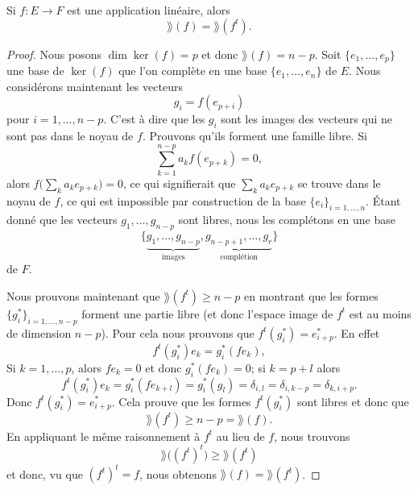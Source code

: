 \begin{lemma}   \label{LemSEpTcW}
    Si \( f\colon E\to F\) est une application linéaire, alors
    \begin{equation}
        \rang(f)=\rang(f^t).
    \end{equation}
\end{lemma}

\begin{proof}
    Nous posons \( \dim\ker(f)=p\) et donc \( \rang(f)=n-p\). Soit \( \{ e_1,\ldots, e_p \}\) une base de \( \ker(f)\) que l'on complète en une base \( \{ e_1,\ldots, e_n \}\) de \( E\). Nous considérons maintenant les vecteurs
    \begin{equation}
        g_i=f(e_{p+i})
    \end{equation}
    pour \( i=1,\ldots, n-p\). C'est à dire que les \( g_i\) sont les images des vecteurs qui ne sont pas dans le noyau de \( f\). Prouvons qu'ils forment une famille libre. Si
    \begin{equation}
        \sum_{k=1}^{n-p}a_kf(e_{p+k})=0,
    \end{equation}
    alors \( f\big( \sum_ka_ke_{p+k} \big)=0\), ce qui signifierait que \( \sum_ka_ke_{p+k}\) se trouve dans le noyau de \( f\), ce qui est impossible par construction de la base \( \{ e_i \}_{i=1,\ldots, n}\). Étant donné que les vecteurs \( g_1,\ldots, g_{n-p}\) sont libres, nous les complétons en une base
    \begin{equation}
        \{ \underbrace{g_1,\ldots, g_{n-p}}_{\text{images}},\underbrace{g_{n-p+1},\ldots, g_r}_{\text{complétion}} \}
    \end{equation}
    de \( F\).

    Nous prouvons maintenant que \( \rang(f^t)\geq n-p\) en montrant que les formes \( \{ g_i^* \}_{i=1,\ldots, n-p}\) forment une partie libre (et donc l'espace image de \( f^t\) est au moins de dimension \( n-p\)). Pour cela nous prouvons que \( f^t(g_i^*)=e^*_{i+p}\). En effet
    \begin{equation}
        f^t(g^*_i)e_k=g_i^*(fe_k),
    \end{equation}
    Si \( k=1,\ldots, p\), alors \( fe_k=0\) et donc \( g_i^*(fe_k)=0\); si \( k=p+l\) alors
    \begin{equation}
        f^t(g_i^*)e_k=g_i^*(fe_{k+l})=g^*_i(g_l)=\delta_{i,l}=\delta_{i,k-p}=\delta_{k,i+p}.
    \end{equation}
    Donc \( f^t(g_i^*)=e^*_{i+p}\). Cela prouve que les formes \( f^t(g_i^*)\) sont libres et donc que
    \begin{equation}
        \rang(f^t)\geq n-p=\rang(f).
    \end{equation}
    En appliquant le même raisonnement à \( f^t\) au lieu de \( f\), nous trouvons
    \begin{equation}
        \rang\big( (f^t)^t \big)\geq \rang(f^t)
    \end{equation}
    et donc, vu que \( (f^t)^t=f\), nous obtenons \( \rang(f)=\rang(f^t)\).

\end{proof}

